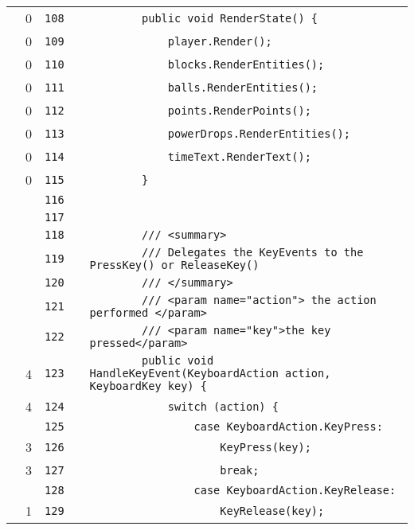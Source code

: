 \documentclass[a4paper,landscape,10pt]{article}
\begin{document}
\begin{longtable}[l]{lrrll}
\cellcolor{red} & 0 & \verb~108~ & & \verb~        public void RenderState() {~\\
\cellcolor{red} & 0 & \verb~109~ & & \verb~            player.Render();~\\
\cellcolor{red} & 0 & \verb~110~ & & \verb~            blocks.RenderEntities();~\\
\cellcolor{red} & 0 & \verb~111~ & & \verb~            balls.RenderEntities();~\\
\cellcolor{red} & 0 & \verb~112~ & & \verb~            points.RenderPoints();~\\
\cellcolor{red} & 0 & \verb~113~ & & \verb~            powerDrops.RenderEntities();~\\
\cellcolor{red} & 0 & \verb~114~ & & \verb~            timeText.RenderText();~\\
\cellcolor{red} & 0 & \verb~115~ & & \verb~        }~\\
\cellcolor{gray} &  & \verb~116~ & & \verb~~\\
\cellcolor{gray} &  & \verb~117~ & & \verb~~\\
\cellcolor{gray} &  & \verb~118~ & & \verb~        /// <summary>~\\
\cellcolor{gray} &  & \verb~119~ & & \verb~        /// Delegates the KeyEvents to the PressKey() or ReleaseKey()~\\
\cellcolor{gray} &  & \verb~120~ & & \verb~        /// </summary>~\\
\cellcolor{gray} &  & \verb~121~ & & \verb~        /// <param name="action"> the action performed </param>~\\
\cellcolor{gray} &  & \verb~122~ & & \verb~        /// <param name="key">the key pressed</param>~\\
\cellcolor{green} & 4 & \verb~123~ & & \verb~        public void HandleKeyEvent(KeyboardAction action, KeyboardKey key) {~\\
\cellcolor{green} & 4 & \verb~124~ & & \verb~            switch (action) {~\\
\cellcolor{gray} &  & \verb~125~ & & \verb~                case KeyboardAction.KeyPress:~\\
\cellcolor{green} & 3 & \verb~126~ & & \verb~                    KeyPress(key);~\\
\cellcolor{green} & 3 & \verb~127~ & & \verb~                    break;~\\
\cellcolor{gray} &  & \verb~128~ & & \verb~                case KeyboardAction.KeyRelease:~\\
\cellcolor{green} & 1 & \verb~129~ & & \verb~                    KeyRelease(key);~\\

\end{longtable}
\end{document}

